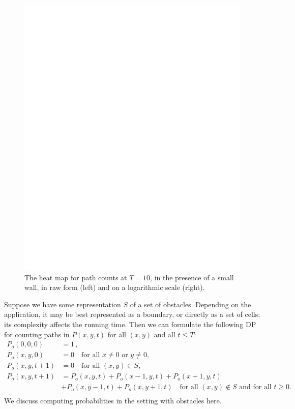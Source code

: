 \documentclass[11pt,a4paper,twoside,british]{article}
\begin{document}
\begin{figure}[p]
\includegraphics{dummy.png}
\caption{The heat map for path counts at $T = 10$, in the presence of a small
wall, in raw form (left) and on a logarithmic scale (right).}
\label{fig:sm_wall}
\end{figure}

Suppose we have some representation $S$ of a set of obstacles.
Depending on the application, it may be best represented as a boundary, or
directly as a set of cells; its complexity affects the running time.
Then we can formulate the following DP for counting paths in $P(x, y, t)$ for
all $(x, y)$ and all $t \leq T$:
\begin{align*}
P_o(0, 0, 0) &= 1\,,\\
P_o(x, y, 0) &= 0 \quad\text{for all $x \neq 0$ or $y \neq 0$,}\\
P_o(x, y, t + 1) &= 0 \quad\text{for all $(x, y) \in S$,}\\
P_o(x, y, t + 1) &= P_o(x, y, t) + P_o(x - 1, y, t) + P_o(x + 1, y, t)\\
&+ P_o(x, y - 1, t) + P_o(x, y + 1, t)
\quad\text{for all $(x, y) \notin S$ and for all $t \geq 0$.}\\
\end{align*}
We discuss computing probabilities in the setting with obstacles here.
\end{document}
